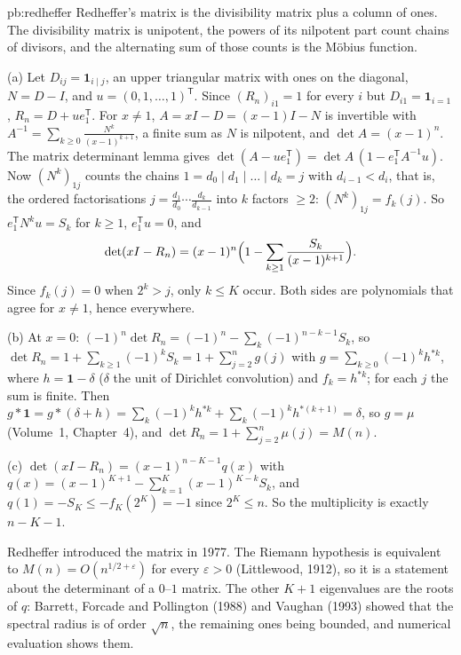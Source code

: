 \begin{solution}{pb:redheffer}
\idea Redheffer's matrix is the divisibility matrix plus a column of ones. The divisibility matrix is unipotent, the powers of its nilpotent part count chains of divisors, and the alternating sum of
those counts is the Möbius function.

\writeup (a) Let $D_{ij}=\mathbf 1_{i\mid j}$, an upper triangular matrix with ones on the diagonal, $N=D-I$, and $u=(0,1,\dots,1)^{\mathsf T}$. Since $(R_n)_{i1}=1$ for every $i$ but $D_{i1}=\mathbf 1_{i=1}$,
$R_n=D+ue_1^{\mathsf T}$. For $x\ne1$, $A=xI-D=(x-1)I-N$ is invertible with $A^{-1}=\sum_{k\ge0}\frac{N^k}{(x-1)^{k+1}}$, a finite sum as $N$ is nilpotent, and $\det A=(x-1)^n$. The matrix
determinant lemma gives $\det(A-ue_1^{\mathsf T})=\det A\,(1-e_1^{\mathsf T}A^{-1}u)$. Now $(N^k)_{1j}$ counts the chains $1=d_0\mid d_1\mid\dots\mid d_k=j$ with $d_{i-1}<d_i$, that is, the ordered
factorisations $j=\frac{d_1}{d_0}\cdots\frac{d_k}{d_{k-1}}$ into $k$ factors $\ge2$: $(N^k)_{1j}=f_k(j)$. So $e_1^{\mathsf T}N^ku=S_k$ for $k\ge1$, $e_1^{\mathsf T}u=0$, and
\[
\det(xI-R_n)=(x-1)^n\Bigl(1-\sum_{k\ge1}\frac{S_k}{(x-1)^{k+1}}\Bigr).
\]
Since $f_k(j)=0$ when $2^k>j$, only $k\le K$ occur. Both sides are polynomials that agree for $x\ne1$, hence everywhere.

(b) At $x=0$: $(-1)^n\det R_n=(-1)^n-\sum_k(-1)^{n-k-1}S_k$, so $\det R_n=1+\sum_{k\ge1}(-1)^kS_k=1+\sum_{j=2}^ng(j)$ with $g=\sum_{k\ge0}(-1)^kh^{*k}$, where $h=\mathbf 1-\delta$ ($\delta$ the unit
of Dirichlet convolution) and $f_k=h^{*k}$; for each $j$ the sum is finite. Then $g*\mathbf 1=g*(\delta+h)=\sum_k(-1)^kh^{*k}+\sum_k(-1)^kh^{*(k+1)}=\delta$, so $g=\mu$ (Volume~1, Chapter~4), and
$\det R_n=1+\sum_{j=2}^n\mu(j)=M(n)$.

(c) $\det(xI-R_n)=(x-1)^{n-K-1}q(x)$ with $q(x)=(x-1)^{K+1}-\sum_{k=1}^K(x-1)^{K-k}S_k$, and $q(1)=-S_K\le-f_K(2^K)=-1$ since $2^K\le n$. So the multiplicity is exactly $n-K-1$.

\leads Redheffer introduced the matrix in 1977. The Riemann hypothesis is equivalent to $M(n)=O(n^{1/2+\varepsilon})$ for every $\varepsilon>0$ (Littlewood, 1912), so it is a statement about the
determinant of a $0$--$1$ matrix. The other $K+1$ eigenvalues are the roots of $q$: Barrett, Forcade and Pollington (1988) and Vaughan (1993) showed that the spectral radius is of order $\sqrt n$,
the remaining ones being bounded, and numerical evaluation shows them.
\end{solution}

